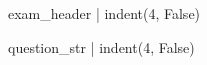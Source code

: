 \documentclass[12pt,a4paper,notitlepage]{article}
\begin{document}
    {{exam_header | indent(4, False)}}

    {{ question_str | indent(4, False) }}
\end{document}
